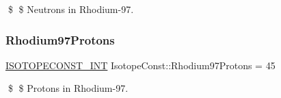 \$ \$ Neutrons in Rhodium-\/97. \mbox{\label{group___isotope_const-_rhodium-_rh97_ga26f6d0c2970ce99ac565fc2e1a1197f8}} 
\subsubsection{\texorpdfstring{Rhodium97\+Protons}{Rhodium97Protons}}
{\footnotesize\ttfamily \mbox{\hyperlink{group___isotope_const-_macros_ga5f18360b3e99483a35c32d789e62621c}{I\+S\+O\+T\+O\+P\+E\+C\+O\+N\+S\+T\+\_\+\+I\+NT}} Isotope\+Const\+::\+Rhodium97\+Protons = 45}

\$ \$ Protons in Rhodium-\/97. 